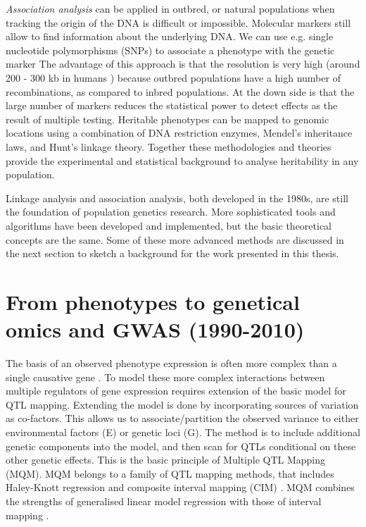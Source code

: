 \emph{Association analysis} can be applied in outbred, or natural populations when tracking the origin of the DNA is difficult 
or impossible. Molecular markers still allow to find information about the underlying DNA. We can use e.g. single nucleotide 
polymorphisms (SNPs) to associate a phenotype with the genetic marker \cite{Mehta:2013} The advantage of this approach is that 
the resolution is very high (around 200 - 300 kb in humans \cite{HapMap:2005}) because outbred populations have a high number of 
recombinations, as compared to inbred populations. At the down side is that the large number of markers reduces the statistical 
power to detect effects as the result of multiple testing. Heritable phenotypes can be mapped to genomic locations using a 
combination of DNA restriction enzymes, Mendel's inheritance laws, and Hunt's linkage theory. Together these methodologies and 
theories provide the experimental and statistical background to analyse heritability in any population.

Linkage analysis and association analysis, both developed in the 1980s, are still the foundation of population genetics research. 
More sophisticated tools and algorithms have been developed and implemented, but the basic theoretical concepts are the same. 
Some of these more advanced methods are discussed in the next section to sketch a background for the work presented in this 
thesis. 

\section{From phenotypes to genetical omics and GWAS (1990-2010)}

The basis of an observed phenotype expression is often more complex than a single causative gene \cite{Sinha:2006, 
West:2007}. To model these more complex interactions between multiple regulators of gene expression requires extension of 
the basic model for QTL mapping. Extending the model is done by incorporating sources of variation as co-factors. This 
allows us to associate/partition the observed variance to either environmental factors (E) or genetic loci (G). The method 
is to include additional genetic components into the model, and then scan for QTLs conditional on these other genetic effects. 
This is the basic principle of Multiple QTL Mapping (MQM). MQM belongs to a family of QTL mapping methods, that includes 
Haley-Knott regression \cite{Haley:1992} and composite interval mapping (CIM) \cite{Zeng:1994}. MQM combines the strengths 
of generalised linear model regression with those of interval mapping \cite{Jansen:1993, Jansen:1994b}.

